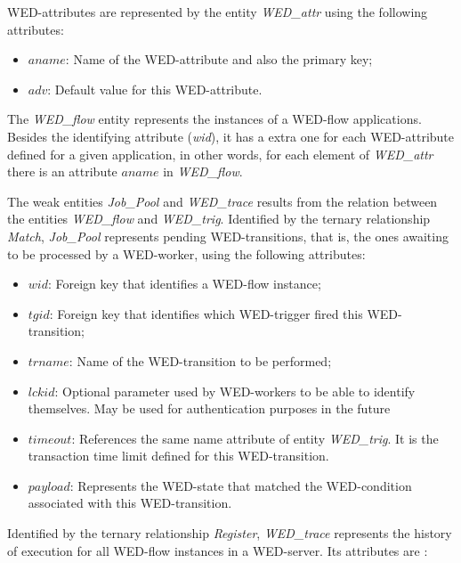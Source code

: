 \documentclass[conference]{IEEEtran}
\begin{document}
\par WED-attributes are represented by the entity \emph{WED\_attr} using the following attributes:
\begin{itemize}
\item $aname$: Name of the WED-attribute and also the primary key;
\item $adv$: Default value for this WED-attribute.
\end{itemize}

The \emph{WED\_flow} entity represents the instances of a WED-flow applications. Besides the identifying attribute (\emph{wid}),
it has a extra one for each WED-attribute defined for a given application, in other words, for each element of \emph{WED\_attr}
there is an attribute $aname$ in \emph{WED\_flow}.

\par The weak entities \emph{Job\_Pool} and \emph{WED\_trace} results from the relation between the entities \emph{WED\_flow} and 
\emph{WED\_trig}. Identified by the ternary relationship \emph{Match}, \emph{Job\_Pool} represents pending WED-transitions, that is,
the ones awaiting to be processed by a WED-worker, using the following attributes:

\begin{itemize}
\item $wid$: Foreign key that identifies a WED-flow instance;
\item $tgid$: Foreign key that identifies which WED-trigger fired this WED-transition;
\item $trname$: Name of the WED-transition to be performed;
\item $lckid$: Optional parameter used by WED-workers to be able to identify themselves. May be used for authentication
               purposes in the future  
\item $timeout$: References the same name attribute of entity \emph{WED\_trig}. It is the transaction time limit defined for this WED-transition.  
\item $payload$: Represents the WED-state that matched the WED-condition associated with this WED-transition. 
\end{itemize}

Identified by the ternary relationship \emph{Register}, \emph{WED\_trace} represents the history of execution for all WED-flow
instances in a WED-server. Its attributes are :
\end{document}
